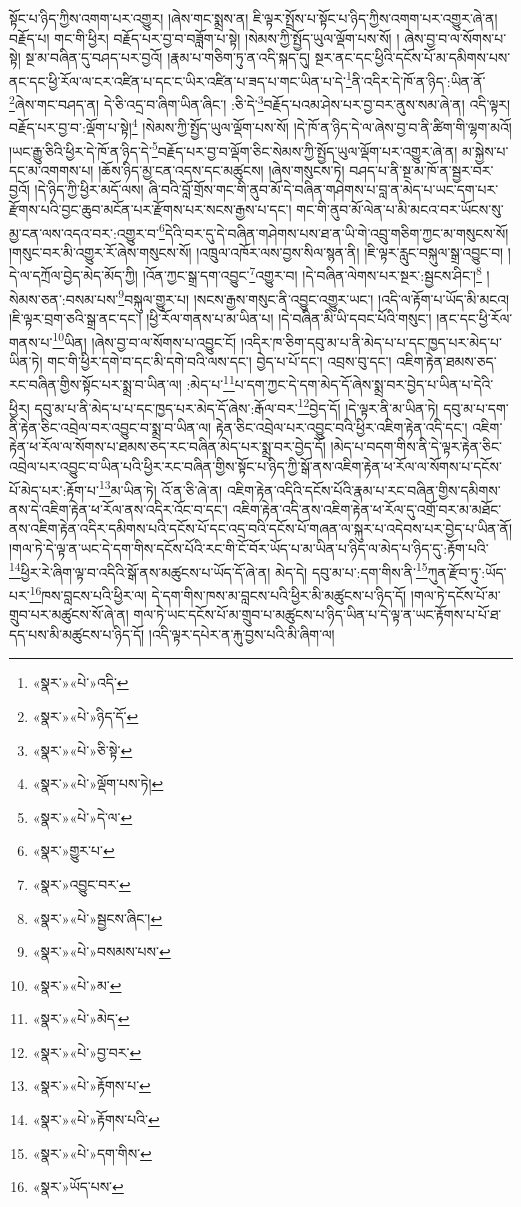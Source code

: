 སྟོང་པ་ཉིད་ཀྱིས་འགག་པར་འགྱུར། །ཞེས་གང་སྨྲས་ན། ཇི་ལྟར་སྤྲོས་པ་སྟོང་པ་ཉིད་ཀྱིས་འགག་པར་འགྱུར་ཞེ་ན། བརྗོད་པ། གང་གི་ཕྱིར། བརྗོད་པར་བྱ་བ་བཟློག་པ་སྟེ། །སེམས་ཀྱི་སྤྱོད་ཡུལ་ལྡོག་པས་སོ། །
ཞེས་བྱ་བ་ལ་སོགས་པ་སྟེ། སྔ་མ་བཞིན་དུ་བཤད་པར་བྱའོ། །རྣམ་པ་གཅིག་ཏུ་ན་འདི་སྐད་དུ། སྔར་ནང་དང་ཕྱིའི་དངོས་པོ་མ་དམིགས་པས་ནང་དང་ཕྱི་རོལ་ལ་ངར་འཛིན་པ་དང་ང་ཡིར་འཛིན་པ་ཟད་པ་གང་ཡིན་པ་དེ་\footnote{«སྣར་»«པེ་»འདི་}ནི་འདིར་དེ་ཁོ་ན་ཉིད་:ཡིན་ནོ་\footnote{«སྣར་»«པེ་»ཉིད་དོ་}ཞེས་གང་བཤད་ན། དེ་ཅི་འདྲ་བ་ཞིག་ཡིན་ཞིང་། :ཅི་དེ་\footnote{«སྣར་»«པེ་»ཅི་སྟེ་}བརྗོད་པའམ་ཤེས་པར་བྱ་བར་ནུས་སམ་ཞེ་ན། འདི་ལྟར། བརྗོད་པར་བྱ་བ་:ལྡོག་པ་སྟེ།\footnote{«སྣར་»«པེ་»ལྡོག་པས་ཏེ།} །སེམས་ཀྱི་སྤྱོད་ཡུལ་ལྡོག་པས་སོ། །དེ་ཁོ་ན་ཉིད་དེ་ལ་ཞེས་བྱ་བ་ནི་ཚིག་གི་ལྷག་མའོ། །ཡང་རྒྱུ་ཅིའི་ཕྱིར་དེ་ཁོ་ན་ཉིད་དེ་\footnote{«སྣར་»«པེ་»དེ་ལ་}བརྗོད་པར་བྱ་བ་ལྡོག་ཅིང་སེམས་ཀྱི་སྤྱོད་ཡུལ་ལྡོག་པར་འགྱུར་ཞེ་ན། མ་སྐྱེས་པ་དང་མ་འགགས་པ། །ཆོས་ཉིད་མྱ་ངན་འདས་དང་མཚུངས། །ཞེས་གསུངས་ཏེ། བཤད་པ་ནི་སྔ་མ་ཁོ་ན་སྦྱར་བར་བྱའོ། །དེ་ཉིད་ཀྱི་ཕྱིར་མདོ་ལས། ཞི་བའི་བློ་གྲོས་གང་གི་ནུབ་མོ་དེ་བཞིན་གཤེགས་པ་བླ་ན་མེད་པ་ཡང་དག་པར་རྫོགས་པའི་བྱང་ཆུབ་མངོན་པར་རྫོགས་པར་སངས་རྒྱས་པ་དང་། གང་གི་ནུབ་མོ་ལེན་པ་མི་མངའ་བར་ཡོངས་སུ་མྱ་ངན་ལས་འདའ་བར་:འགྱུར་བ་\footnote{«སྣར་»གྱུར་པ་}དེའི་བར་དུ་དེ་བཞིན་གཤེགས་པས་ཐ་ན་ཡི་གེ་འབྲུ་གཅིག་ཀྱང་མ་གསུངས་སོ། །གསུང་བར་མི་འགྱུར་རོ་ཞེས་གསུངས་སོ། །འཁྲུལ་འཁོར་ལས་བྱས་སིལ་སྙན་ནི། །ཇི་ལྟར་རླུང་བསྐུལ་སྒྲ་འབྱུང་བ། །དེ་ལ་དཀྲོལ་བྱེད་མེད་མོད་ཀྱི། །འོན་ཀྱང་སྒྲ་དག་འབྱུང་\footnote{«སྣར་»འབྱུང་བར་}འགྱུར་བ། །དེ་བཞིན་ལེགས་པར་སྔར་:སྦྱངས་ཤིང་།\footnote{«སྣར་»«པེ་»སྦྱངས་ཞིང་།} །སེམས་ཅན་:བསམ་པས་\footnote{«སྣར་»«པེ་»བསམས་པས་}བསྐུལ་གྱུར་པ། །སངས་རྒྱས་གསུང་ནི་འབྱུང་འགྱུར་ཡང་། །འདི་ལ་རྟོག་པ་ཡོད་མི་མངའ། །ཇི་ལྟར་བྲག་ཅའི་སྒྲ་ནང་དང་། །ཕྱི་རོལ་གནས་པ་མ་ཡིན་པ། །དེ་བཞིན་མི་ཡི་དབང་པོའི་གསུང་། །ནང་དང་ཕྱི་རོལ་གནས་པ་\footnote{«སྣར་»«པེ་»མ་}ཡིན། །ཞེས་བྱ་བ་ལ་སོགས་པ་འབྱུང་ངོ། །འདིར་ཁ་ཅིག་དབུ་མ་པ་ནི་མེད་པ་པ་དང་ཁྱད་པར་མེད་པ་ཡིན་ཏེ། གང་གི་ཕྱིར་དགེ་བ་དང་མི་དགེ་བའི་ལས་དང་། བྱེད་པ་པོ་དང་། འབྲས་བུ་དང་། འཇིག་རྟེན་ཐམས་ཅད་རང་བཞིན་གྱིས་སྟོང་པར་སྨྲ་བ་ཡིན་ལ། :མེད་པ་\footnote{«སྣར་»«པེ་»མེད་}པ་དག་ཀྱང་དེ་དག་མེད་དོ་ཞེས་སྨྲ་བར་བྱེད་པ་ཡིན་པ་དེའི་ཕྱིར། དབུ་མ་པ་ནི་མེད་པ་པ་དང་ཁྱད་པར་མེད་དོ་ཞེས་:རྒོལ་བར་\footnote{«སྣར་»«པེ་»བྱ་བར་}བྱེད་དོ། །དེ་ལྟར་ནི་མ་ཡིན་ཏེ། དབུ་མ་པ་དག་ནི་རྟེན་ཅིང་འབྲེལ་བར་འབྱུང་བ་སྨྲ་བ་ཡིན་ལ། རྟེན་ཅིང་འབྲེལ་པར་འབྱུང་བའི་ཕྱིར་འཇིག་རྟེན་འདི་དང་། འཇིག་རྟེན་ཕ་རོལ་ལ་སོགས་པ་ཐམས་ཅད་རང་བཞིན་མེད་པར་སྨྲ་བར་བྱེད་དོ། །མེད་པ་བདག་གིས་ནི་དེ་ལྟར་རྟེན་ཅིང་འབྲེལ་པར་འབྱུང་བ་ཡིན་པའི་ཕྱིར་རང་བཞིན་གྱིས་སྟོང་པ་ཉིད་ཀྱི་སྒོ་ནས་འཇིག་རྟེན་ཕ་རོལ་ལ་སོགས་པ་དངོས་པོ་མེད་པར་:རྟོག་པ་\footnote{«སྣར་»«པེ་»རྟོགས་པ་}མ་ཡིན་ཏེ། འོ་ན་ཅི་ཞེ་ན། འཇིག་རྟེན་འདིའི་དངོས་པོའི་རྣམ་པ་རང་བཞིན་གྱིས་དམིགས་ནས་དེ་འཇིག་རྟེན་ཕ་རོལ་ནས་འདིར་འོང་བ་དང་། འཇིག་རྟེན་འདི་ནས་འཇིག་རྟེན་ཕ་རོལ་དུ་འགྲོ་བར་མ་མཐོང་ནས་འཇིག་རྟེན་འདིར་དམིགས་པའི་དངོས་པོ་དང་འདྲ་བའི་དངོས་པོ་གཞན་ལ་སྐུར་པ་འདེབས་པར་བྱེད་པ་ཡིན་ནོ། །གལ་ཏེ་དེ་ལྟ་ན་ཡང་དེ་དག་གིས་དངོས་པོའི་རང་གི་ངོ་བོར་ཡོད་པ་མ་ཡིན་པ་ཉིད་ལ་མེད་པ་ཉིད་དུ་:རྟོག་པའི་\footnote{«སྣར་»«པེ་»རྟོགས་པའི་}ཕྱིར་རེ་ཞིག་ལྟ་བ་འདིའི་སྒོ་ནས་མཚུངས་པ་ཡོད་དོ་ཞེ་ན། མེད་དེ། དབུ་མ་པ་:དག་གིས་ནི་\footnote{«སྣར་»«པེ་»དག་གིས་}ཀུན་རྫོབ་ཏུ་:ཡོད་པར་\footnote{«སྣར་»ཡོད་པས་}ཁས་བླངས་པའི་ཕྱིར་ལ། དེ་དག་གིས་ཁས་མ་བླངས་པའི་ཕྱིར་མི་མཚུངས་པ་ཉིད་དོ། །གལ་ཏེ་དངོས་པོ་མ་གྲུབ་པར་མཚུངས་སོ་ཞེ་ན། གལ་ཏེ་ཡང་དངོས་པོ་མ་གྲུབ་པ་མཚུངས་པ་ཉིད་ཡིན་པ་དེ་ལྟ་ན་ཡང་རྟོགས་པ་པོ་ཐ་དད་པས་མི་མཚུངས་པ་ཉིད་དོ། །འདི་ལྟར་དཔེར་ན་རྐུ་བྱས་པའི་མི་ཞིག་ལ། 